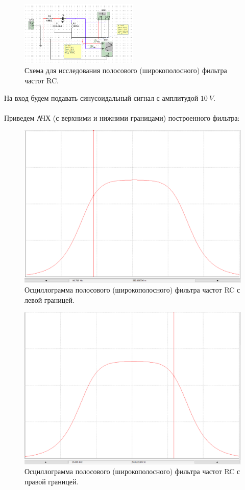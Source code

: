 \documentclass[12pt]{article}
\begin{document}
\begin{figure}[H]
    \centering
    \includegraphics[width=0.5\textwidth]{4_scheme.png}
    \caption{Схема для исследования полосового (широкополосного) фильтра частот RC.}
    \label{fig:4_scheme}
\end{figure}

На вход будем подавать синусоидальный сигнал с амплитудой $10 \ V$. \\
\ \\
Приведем АЧХ (с верхними и нижними границами) построенного фильтра:
\begin{figure}[H]
    \centering
    \includegraphics[width=\textwidth]{4_bode_left.png}
    \caption{Осциллограмма полосового (широкополосного) фильтра частот RC с левой границей.}
    \label{fig:4_osc_left}
\end{figure}

\begin{figure}[H]
    \centering
    \includegraphics[width=\textwidth]{4_bode_right.png}
    \caption{Осциллограмма полосового (широкополосного) фильтра частот RC с правой границей.}
    \label{fig:4_osc_right}
\end{figure}
\end{document}
